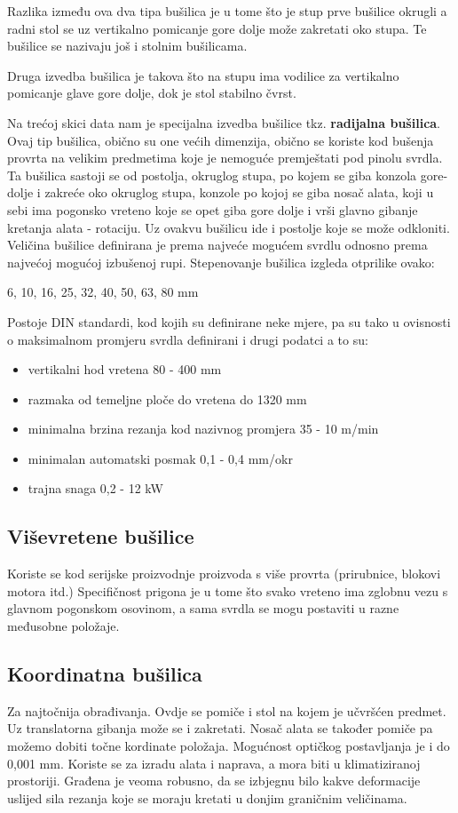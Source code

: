 \documentclass[a4paper,12pt]{article}
\numberwithin{figure}{section}
\begin{document}
\FloatBarrier
Razlika između ova dva tipa bušilica je u tome što je stup prve bušilice okrugli a radni stol se uz vertikalno pomicanje gore dolje može zakretati oko stupa. Te bušilice se nazivaju još i stolnim bušilicama. \par
Druga izvedba bušilica je takova što na stupu ima vodilice za vertikalno pomicanje glave gore dolje, dok je stol stabilno čvrst. \par
Na trećoj skici data nam je specijalna izvedba bušilice tkz. \textbf{radijalna bušilica}. Ovaj tip bušilica,  obično su one većih dimenzija, obično se koriste kod bušenja provrta na velikim predmetima koje je nemoguće premještati pod pinolu svrdla. Ta bušilica sastoji se od postolja, okruglog stupa, po kojem se giba konzola gore-dolje i zakreće oko okruglog stupa, konzole po kojoj se  giba nosač alata, koji u sebi ima pogonsko vreteno koje se opet giba gore dolje i vrši glavno gibanje kretanja alata - rotaciju. Uz ovakvu bušilicu ide i postolje koje se može odkloniti. Veličina bušilice definirana je prema najveće mogućem svrdlu odnosno prema najvećoj mogućoj izbušenoj rupi. Stepenovanje bušilica izgleda otprilike ovako:
\begin{center}
6, 10, 16, 25, 32, 40, 50, 63, 80 mm
\end{center}
Postoje DIN standardi, kod kojih su definirane neke mjere, pa su tako u ovisnosti o maksimalnom promjeru svrdla definirani i drugi podatci a to su:
\begin{itemize}
\item vertikalni hod vretena 80 - 400 mm
\item razmaka od temeljne ploče do vretena do 1320 mm
\item minimalna brzina rezanja kod nazivnog promjera  35 - 10 m/min
\item minimalan automatski posmak 0,1 - 0,4 mm/okr
\item trajna snaga 0,2 - 12 kW
\end{itemize}
\subsection{Viševretene bušilice}
Koriste se kod serijske proizvodnje proizvoda s više provrta (prirubnice, blokovi motora itd.) Specifičnost prigona je u tome što svako vreteno ima zglobnu vezu s glavnom pogonskom osovinom, a sama svrdla se mogu postaviti u razne međusobne položaje.
\subsection{Koordinatna bušilica}
Za najtočnija obrađivanja. Ovdje se pomiče i stol na kojem je učvršćen predmet. Uz translatorna gibanja može se i zakretati. Nosač alata se također pomiče pa možemo dobiti točne kordinate položaja. Mogućnost optičkog postavljanja je i do 0,001 mm. Koriste se za izradu alata i naprava, a mora biti u klimatiziranoj prostoriji. Građena je veoma robusno, da se izbjegnu bilo kakve deformacije uslijed sila rezanja koje se moraju kretati u donjim graničnim veličinama.
\end{document}

